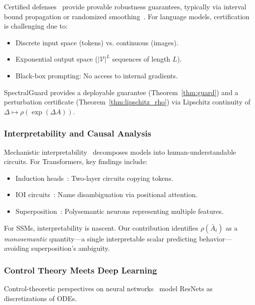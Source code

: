 \documentclass[10pt,twocolumn]{article}
\begin{document}
Certified defenses~\cite{jia2019certified,huang2019achieving} provide provable robustness guarantees, typically via interval bound propagation or randomized smoothing~\cite{cohen2019certified}. For language models, certification is challenging due to:
\begin{itemize}
\item Discrete input space (tokens) vs. continuous (images).
\item Exponential output space ($|\mathcal{V}|^L$ sequences of length $L$).
\item Black-box prompting: No access to internal gradients.
\end{itemize}

SpectralGuard provides a deployable guarantee (Theorem~\ref{thm:guard}) and a perturbation certificate (Theorem~\ref{thm:lipschitz_rho}) via Lipschitz continuity of $\Delta \mapsto \rho(\exp(\Delta A))$.

\subsubsection{Interpretability and Causal Analysis}

Mechanistic interpretability~\cite{elhage2021mathematical,olah2020zoom} decomposes models into human-understandable circuits. For Transformers, key findings include:
\begin{itemize}
\item Induction heads~\cite{olsson2022context}: Two-layer circuits copying tokens.
\item IOI circuits~\cite{wang2022interpretability}: Name disambiguation via positional attention.
\item Superposition~\cite{elhage2022toy}: Polysemantic neurons representing multiple features.
\end{itemize}

For SSMs, interpretability is nascent. Our contribution identifies $\rho(\bar{A}_t)$ as a \emph{monosemantic} quantity---a single interpretable scalar predicting behavior---avoiding superposition's ambiguity.

\subsubsection{Control Theory Meets Deep Learning}

Control-theoretic perspectives on neural networks~\cite{haber2017stable,ruthotto2020deep} model ResNets as discretizations of ODEs.
\end{document}
